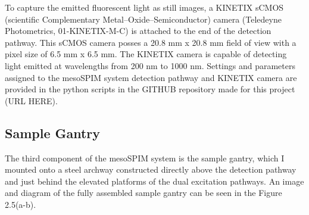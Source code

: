 To capture the emitted fluorescent light as still images, a KINETIX sCMOS (scientific Complementary Metal–Oxide–Semiconductor) camera (Teledeyne Photometrics, 01-KINETIX-M-C) is attached to the end of the detection pathway. This sCMOS camera posses a 20.8 mm x 20.8 mm field of view with a pixel size of 6.5 mm x 6.5 mm. The KINETIX camera is capable of detecting light emitted at wavelengths from 200 nm to 1000 nm. Settings and parameters assigned to the mesoSPIM system detection pathway and KINETIX camera are provided in the python scripts in the GITHUB repository made for this project (URL HERE).



\subsection{Sample Gantry}
The third component of the mesoSPIM system is the sample gantry, which I mounted onto a steel archway constructed directly above the detection pathway and just behind the elevated platforms of the dual excitation pathways. An image and diagram of the fully assembled sample gantry can be seen in the Figure 2.5(a-b).

